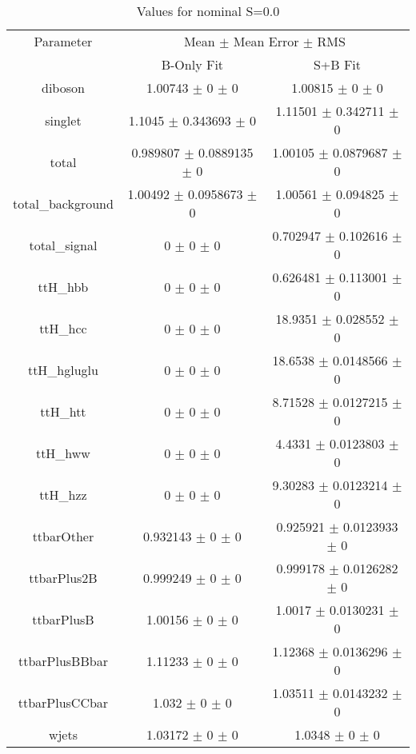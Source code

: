 \begin{table}
\centering
\caption{Values for nominal S=0.0}
\begin{tabular}{ccc}
\toprule
Parameter & \multicolumn{2}{c}{Mean $\pm$ Mean Error $\pm$ RMS}\\
 & B-Only Fit & S+B Fit\\
\midrule
diboson & \num{1.00743} $\pm$ \num{0} $\pm$ \num{0} & \num{1.00815} $\pm$ \num{0} $\pm$ \num{0}\\
singlet & \num{1.1045} $\pm$ \num{0.343693} $\pm$ \num{0} & \num{1.11501} $\pm$ \num{0.342711} $\pm$ \num{0}\\
total & \num{0.989807} $\pm$ \num{0.0889135} $\pm$ \num{0} & \num{1.00105} $\pm$ \num{0.0879687} $\pm$ \num{0}\\
total\_background & \num{1.00492} $\pm$ \num{0.0958673} $\pm$ \num{0} & \num{1.00561} $\pm$ \num{0.094825} $\pm$ \num{0}\\
total\_signal & \num{0} $\pm$ \num{0} $\pm$ \num{0} & \num{0.702947} $\pm$ \num{0.102616} $\pm$ \num{0}\\
ttH\_hbb & \num{0} $\pm$ \num{0} $\pm$ \num{0} & \num{0.626481} $\pm$ \num{0.113001} $\pm$ \num{0}\\
ttH\_hcc & \num{0} $\pm$ \num{0} $\pm$ \num{0} & \num{18.9351} $\pm$ \num{0.028552} $\pm$ \num{0}\\
ttH\_hgluglu & \num{0} $\pm$ \num{0} $\pm$ \num{0} & \num{18.6538} $\pm$ \num{0.0148566} $\pm$ \num{0}\\
ttH\_htt & \num{0} $\pm$ \num{0} $\pm$ \num{0} & \num{8.71528} $\pm$ \num{0.0127215} $\pm$ \num{0}\\
ttH\_hww & \num{0} $\pm$ \num{0} $\pm$ \num{0} & \num{4.4331} $\pm$ \num{0.0123803} $\pm$ \num{0}\\
ttH\_hzz & \num{0} $\pm$ \num{0} $\pm$ \num{0} & \num{9.30283} $\pm$ \num{0.0123214} $\pm$ \num{0}\\
ttbarOther & \num{0.932143} $\pm$ \num{0} $\pm$ \num{0} & \num{0.925921} $\pm$ \num{0.0123933} $\pm$ \num{0}\\
ttbarPlus2B & \num{0.999249} $\pm$ \num{0} $\pm$ \num{0} & \num{0.999178} $\pm$ \num{0.0126282} $\pm$ \num{0}\\
ttbarPlusB & \num{1.00156} $\pm$ \num{0} $\pm$ \num{0} & \num{1.0017} $\pm$ \num{0.0130231} $\pm$ \num{0}\\
ttbarPlusBBbar & \num{1.11233} $\pm$ \num{0} $\pm$ \num{0} & \num{1.12368} $\pm$ \num{0.0136296} $\pm$ \num{0}\\
ttbarPlusCCbar & \num{1.032} $\pm$ \num{0} $\pm$ \num{0} & \num{1.03511} $\pm$ \num{0.0143232} $\pm$ \num{0}\\
wjets & \num{1.03172} $\pm$ \num{0} $\pm$ \num{0} & \num{1.0348} $\pm$ \num{0} $\pm$ \num{0}\\
\bottomrule
\end{tabular}
\end{table}